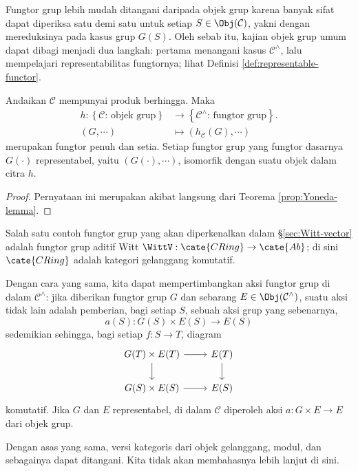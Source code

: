 Fungtor grup lebih mudah ditangani daripada objek grup karena banyak sifat dapat diperiksa satu demi satu untuk setiap $S \in \Obj(\mathcal{C})$, yakni dengan mereduksinya pada kasus grup $G(S)$. Oleh sebab itu, kajian objek grup umum dapat dibagi menjadi dua langkah: pertama menangani kasus $\mathcal{C}^\wedge$, lalu mempelajari representabilitas fungtornya; lihat Definisi \ref{def:representable-functor}.

\begin{lemma}
	Andaikan $\mathcal{C}$ mempunyai produk berhingga. Maka
	\begin{align*}
		h: \left\{ \mathcal{C} \text{: objek grup} \right\} & \longrightarrow \left\{\mathcal{C}^\wedge \text{: fungtor grup} \right\}. \\
		(G, \cdots) & \longmapsto (h_{\mathcal{C}}(G), \cdots)
	\end{align*}
	merupakan fungtor penuh dan setia. Setiap fungtor grup yang fungtor dasarnya $G(\cdot)$ representabel, yaitu $(G(\cdot), \cdots)$, isomorfik dengan suatu objek dalam citra $h$.
\end{lemma}
\begin{proof}
	Pernyataan ini merupakan akibat langsung dari Teorema \ref{prop:Yoneda-lemma}.
\end{proof}

Salah satu contoh fungtor grup yang akan diperkenalkan dalam \S\ref{sec:Witt-vector} adalah fungtor grup aditif Witt $\WittV: \cate{CRing} \to \cate{Ab}$; di sini $\cate{CRing}$ adalah kategori gelanggang komutatif.

\begin{remark}
	Dengan cara yang sama, kita dapat mempertimbangkan aksi fungtor grup di dalam $\mathcal{C}^\wedge$: jika diberikan fungtor grup $G$ dan sebarang $E \in \Obj(\mathcal{C}^\wedge)$, suatu aksi tidak lain adalah pemberian, bagi setiap $S$, sebuah aksi grup yang sebenarnya,
	\[ a(S): G(S) \times E(S) \to E(S) \]
	sedemikian sehingga, bagi setiap $f: S \to T$, diagram
	\[ \begin{tikzcd}
		G(T) \times E(T) \arrow[d] \arrow[r] & E(T) \arrow[d] \\
		G(S) \times E(S) \arrow[r] & E(S)
	\end{tikzcd} \]
	komutatif. Jika $G$ dan $E$ representabel, di dalam $\mathcal{C}$ diperoleh aksi $a: G \times E \to E$ dari objek grup.
\end{remark}
Dengan asas yang sama, versi kategoris dari objek gelanggang, modul, dan sebagainya dapat ditangani. Kita tidak akan membahasnya lebih lanjut di sini.

